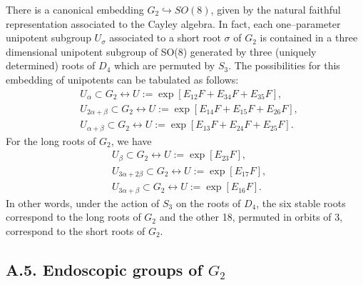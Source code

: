 \documentclass[12pt,letterpaper]{amsart}
\begin{document}
There is a canonical embedding $G_2 \hookrightarrow SO(8)$, given by
the natural faithful representation associated to the Cayley algebra.
In fact, each one--parameter unipotent subgroup $U_{\sigma}$ associated to a
short root $\sigma$ of $G_2$ is contained in a three dimensional unipotent
subgroup of SO(8) generated by three (uniquely determined) roots of
$D_4$ which are permuted by $S_3$.
The possibilities for this embedding of unipotents can be tabulated
as follows:
\[
\begin{split}
&U_{\alpha} \subset G_2 \longleftrightarrow
U := \exp[E_{12}F+E_{34}F+E_{35}F],\\
&U_{2\alpha +\beta} \subset G_2 \longleftrightarrow
U := \exp[E_{14}F+ E_{15}F+E_{26}F],\\
&U_{\alpha+\beta} \subset G_2 \longleftrightarrow
U := \exp[E_{13}F+E_{24}F+E_{25}F].
\end{split}\tag{A.14}
\]
For the long roots of $G_2$, we have
\[
\begin{split}
&U_{\beta} \subset G_2 \longleftrightarrow
U := \exp[E_{23}F],\\
&U_{3\alpha +2\beta} \subset G_2 \longleftrightarrow
U := \exp[E_{17}F],\\
&U_{3\alpha+\beta} \subset G_2 \longleftrightarrow
U := \exp[E_{16}F].
\end{split}\tag{A.15}
\]
In other words, under the action of $S_3$ on the roots of
$D_4$, the six stable roots correspond to the long roots of $G_2$
and the other 18, permuted in orbits of 3, correspond to the short
roots of $ G_2$.

\subsection*{A.5. Endoscopic groups of $G_2$}
\end{document}
